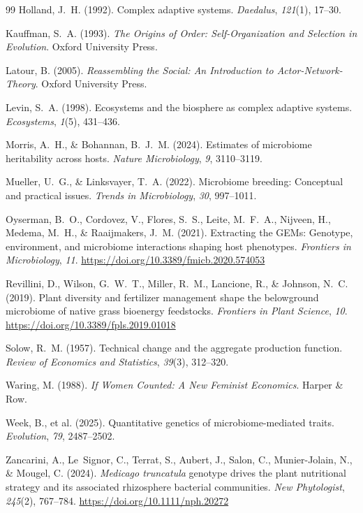 \documentclass[11pt, a4paper]{article}
\begin{document}
\begin{thebibliography}{99}
Holland, J.~H. (1992). Complex adaptive systems. \textit{Daedalus}, \textit{121}(1), 17--30.

Kauffman, S.~A. (1993). \textit{The Origins of Order: Self-Organization and Selection in Evolution}. Oxford University Press.

Latour, B. (2005). \textit{Reassembling the Social: An Introduction to Actor-Network-Theory}. Oxford University Press.

Levin, S.~A. (1998). Ecosystems and the biosphere as complex adaptive systems. \textit{Ecosystems}, \textit{1}(5), 431--436.

Morris, A.~H., \& Bohannan, B.~J.~M. (2024). Estimates of microbiome heritability across hosts. \textit{Nature Microbiology}, \textit{9}, 3110--3119.

Mueller, U.~G., \& Linksvayer, T.~A. (2022). Microbiome breeding: Conceptual and practical issues. \textit{Trends in Microbiology}, \textit{30}, 997--1011.

Oyserman, B.~O., Cordovez, V., Flores, S.~S., Leite, M.~F.~A., Nijveen, H., Medema, M.~H., \& Raaijmakers, J.~M. (2021). Extracting the GEMs: Genotype, environment, and microbiome interactions shaping host phenotypes. \textit{Frontiers in Microbiology}, \textit{11}. \url{https://doi.org/10.3389/fmicb.2020.574053}

Revillini, D., Wilson, G.~W.~T., Miller, R.~M., Lancione, R., \& Johnson, N.~C. (2019). Plant diversity and fertilizer management shape the belowground microbiome of native grass bioenergy feedstocks. \textit{Frontiers in Plant Science}, \textit{10}. \url{https://doi.org/10.3389/fpls.2019.01018}

Solow, R.~M. (1957). Technical change and the aggregate production function. \textit{Review of Economics and Statistics}, \textit{39}(3), 312--320.

Waring, M. (1988). \textit{If Women Counted: A New Feminist Economics}. Harper \& Row.

Week, B., et al. (2025). Quantitative genetics of microbiome-mediated traits. \textit{Evolution}, \textit{79}, 2487--2502.

Zancarini, A., Le~Signor, C., Terrat, S., Aubert, J., Salon, C., Munier-Jolain, N., \& Mougel, C. (2024). \textit{Medicago truncatula} genotype drives the plant nutritional strategy and its associated rhizosphere bacterial communities. \textit{New Phytologist}, \textit{245}(2), 767--784. \url{https://doi.org/10.1111/nph.20272}

\end{thebibliography}
\end{document}
